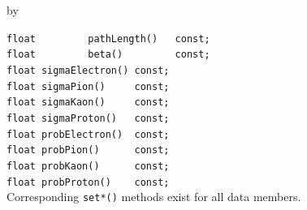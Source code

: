 \documentclass[twoside]{article}
\newcommand{\entrylabel}[1]{\mbox{\textbf{{#1}}}\hfil}%
\newenvironment{entry}
{\begin{list}{}%
    {\renewcommand{\makelabel}{\entrylabel}%
     \setlength{\labelwidth}{90pt}%
     \setlength{\leftmargin}{\labelwidth}
     \advance\leftmargin by \labelsep%
      }%
    }%
  {\end{list}}
\newcommand{\Entrylabel}[1]%
{\raisebox{0pt}[1ex][0pt]{\makebox[\labelwidth][l]%
    {\parbox[t]{\labelwidth}{\hspace{0pt}\textbf{{#1}}}}}}
\newenvironment{Entry}%
{\renewcommand{\entrylabel}{\Entrylabel}\begin{entry}}%
  {\end{entry}}
\begin{document}
\begin{Entry}
    \verb+float         pathLength()   const;+\\
    \verb+float         beta()         const;+\\
    \verb+float sigmaElectron() const;+\\
    \verb+float sigmaPion()     const;+\\
    \verb+float sigmaKaon()     const;+\\
    \verb+float sigmaProton()   const;+\\
    \verb+float probElectron()  const;+\\
    \verb+float probPion()      const;+\\
    \verb+float probKaon()      const;+\\
    \verb+float probProton()    const;+\\
    Corresponding \verb+set*()+ methods exist for all data members.
\end{Entry}
\clearpage
\end{document}
